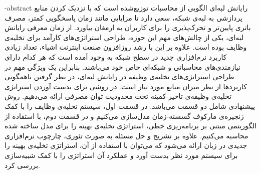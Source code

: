 % 
% 
% 
% 
% 
% 
\fa-abstract{
رایانش لبه‌ای الگویی از محاسبات توزیع‌شده است که با نزدیک کردن منابع پردازشی به لبه‌ی شبکه، سعی دارد تا مزایایی مانند زمان پاسخگویی کمتر، مصرف باتری پایین‌تر و تحرک‌پذیری را برای کاربران به ارمغان بیاورد. از زمان معرفی رایانش لبه‌ای، یکی از چالش‌های مهم این حوزه، طراحی استراتژی‌های کارآمد برای تخلیه‌ی وظایف بوده است. علاوه بر این با رشد روزافزون صنعت اینترنت اشیاء، تعداد زیادی کاربرد نرم‌افزاری جدید در سطح شبکه به وجود آمده است که هر کدام دارای نیازمندی‌های محاسباتی و شبکه‌ای خاص خود می‌باشند. بنابراین یک ویژگی مهم در طراحی استراتژی‌های تخلیه‌ی وظیفه در رایانش لبه‌ای، در نظر گرفتن ناهمگونی کاربردها از نظر میزان منابع مورد نیاز است. در \CurrentProject روشی برای بدست آوردن استراتژی تخلیه‌ی وظیفه‌ی تاخیر-کمینه تحت محدودیت توان مصرفی ارائه می‌دهیم. روش پیشنهادی شامل دو قسمت می‌باشد. در قسمت اول، سیستم تخلیه‌ی وظایف را با کمک زنجیره‌ی مارکوف گسسته-زمان مدل‌سازی می‌کنیم و در قسمت دوم، با استفاده از الگوریتمی مبتنی بر برنامه‌ریزی خطی، استراتژی تخلیه‌ی بهینه را برای مدل ساخته شده محاسبه می‌کنیم. علاوه بر تشریح و حل مسئله به صورت تئوری، چارچوب نرم‌افزاری جدیدی در زبان  ارائه می‌شود که می‌توان با استفاده از آن، استراتژی تخلیه‌ی بهینه را برای سیستم مورد نظر بدست آورد و عملکرد آن استراتژی را با کمک شبیه‌سازی بررسی کرد.
}

\abstractPage

\newpage\clearpage
